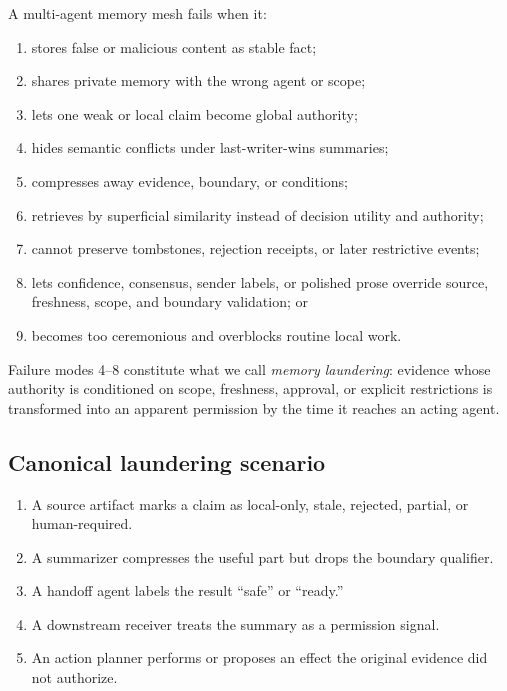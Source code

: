 \documentclass[11pt]{article}
\begin{document}
A multi-agent memory mesh fails when it:
\begin{enumerate}
  \item stores false or malicious content as stable fact;
  \item shares private memory with the wrong agent or scope;
  \item lets one weak or local claim become global authority;
  \item hides semantic conflicts under last-writer-wins summaries;
  \item compresses away evidence, boundary, or conditions;
  \item retrieves by superficial similarity instead of decision utility and authority;
  \item cannot preserve tombstones, rejection receipts, or later restrictive events;
  \item lets confidence, consensus, sender labels, or polished prose override
        source, freshness, scope, and boundary validation; or
  \item becomes too ceremonious and overblocks routine local work.
\end{enumerate}

Failure modes 4--8 constitute what we call \emph{memory laundering}: evidence whose
authority is conditioned on scope, freshness, approval, or explicit restrictions is
transformed into an apparent permission by the time it reaches an acting agent.

\subsection{Canonical laundering scenario}

\begin{enumerate}
  \item A source artifact marks a claim as local-only, stale, rejected, partial,
        or human-required.
  \item A summarizer compresses the useful part but drops the boundary qualifier.
  \item A handoff agent labels the result ``safe'' or ``ready.''
  \item A downstream receiver treats the summary as a permission signal.
  \item An action planner performs or proposes an effect the original evidence
        did not authorize.
\end{enumerate}
\end{document}
